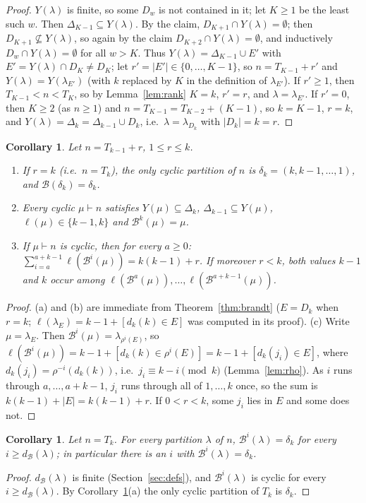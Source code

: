 \documentclass[11pt]{article}
\newtheorem{corollary}[theorem]{Corollary}
\theoremstyle{definition}
\newcommand{\B}{\mathcal{B}}
\newcommand{\dB}{d_{\mathcal{B}}}
\renewcommand{\le}{\leqslant}
\renewcommand{\ge}{\geqslant}
\begin{document}
\begin{proof}
$Y(\lambda)$ is finite, so some $D_w$ is not contained in it; let $K\ge1$ be the least such $w$.  Then
$\Delta_{K-1}\subseteq Y(\lambda)$.  By the claim, $D_{K+1}\cap Y(\lambda)=\emptyset$; then $D_{K+1}\not\subseteq Y(\lambda)$, so
again by the claim $D_{K+2}\cap Y(\lambda)=\emptyset$, and inductively $D_w\cap Y(\lambda)=\emptyset$ for all $w>K$.  Thus
$Y(\lambda)=\Delta_{K-1}\cup E'$ with $E'=Y(\lambda)\cap D_K\ne D_K$; let $r'=|E'|\in\{0,\dots,K-1\}$, so
$n=T_{K-1}+r'$ and $Y(\lambda)=Y(\lambda_{E'})$ (with $k$ replaced by $K$ in the definition of $\lambda_{E'}$).
If $r'\ge1$, then $T_{K-1}<n<T_K$, so by Lemma~\ref{lem:rank} $K=k$, $r'=r$, and $\lambda=\lambda_{E'}$.
If $r'=0$, then $K\ge2$ (as $n\ge1$) and $n=T_{K-1}=T_{K-2}+(K-1)$, so $k=K-1$, $r=k$, and
$Y(\lambda)=\Delta_k=\Delta_{k-1}\cup D_k$, i.e.\ $\lambda=\lambda_{D_k}$ with $|D_k|=k=r$.
\end{proof}

\begin{corollary}\label{cor:cyc}
Let $n=T_{k-1}+r$, $1\le r\le k$.
\begin{enumerate}
\item[(a)] If $r=k$ (i.e.\ $n=T_k$), the only cyclic partition of $n$ is $\delta_k=(k,k-1,\dots,1)$, and
$\B(\delta_k)=\delta_k$.
\item[(b)] Every cyclic $\mu\vdash n$ satisfies $Y(\mu)\subseteq\Delta_k$, $\Delta_{k-1}\subseteq Y(\mu)$,
$\ell(\mu)\in\{k-1,k\}$ and $\B^k(\mu)=\mu$.
\item[(c)] If $\mu\vdash n$ is cyclic, then for every $a\ge0$:
$\sum_{i=a}^{a+k-1}\ell(\B^i(\mu))=k(k-1)+r$.  If moreover $r<k$, both values $k-1$ and $k$ occur among
$\ell(\B^a(\mu)),\dots,\ell(\B^{a+k-1}(\mu))$.
\end{enumerate}
\end{corollary}
\begin{proof}
(a) and (b) are immediate from Theorem~\ref{thm:brandt} ($E=D_k$ when $r=k$; $\ell(\lambda_E)=k-1+[d_k(k)\in E]$ was
computed in its proof).  (c) Write $\mu=\lambda_E$.  Then $\B^i(\mu)=\lambda_{\rho^i(E)}$, so
$\ell(\B^i(\mu))=k-1+[d_k(k)\in\rho^i(E)]=k-1+[d_k(j_i)\in E]$, where $d_k(j_i)=\rho^{-i}(d_k(k))$, i.e.\
$j_i\equiv k-i\pmod k$ (Lemma~\ref{lem:rho}).  As $i$ runs through $a,\dots,a+k-1$, $j_i$ runs through all
of $1,\dots,k$ once, so the sum is $k(k-1)+|E|=k(k-1)+r$.  If $0<r<k$, some $j_i$ lies in $E$ and some does not.
\end{proof}

\begin{corollary}\label{cor:reach}
Let $n=T_k$.  For every partition $\lambda$ of $n$, $\B^i(\lambda)=\delta_k$ for every $i\ge\dB(\lambda)$; in particular there is an
$i$ with $\B^i(\lambda)=\delta_k$.
\end{corollary}
\begin{proof}
$\dB(\lambda)$ is finite (Section~\ref{sec:defs}), and $\B^{i}(\lambda)$ is cyclic for every $i\ge\dB(\lambda)$.  By
Corollary~\ref{cor:cyc}(a) the only cyclic partition of $T_k$ is $\delta_k$.
\end{proof}
\end{document}
